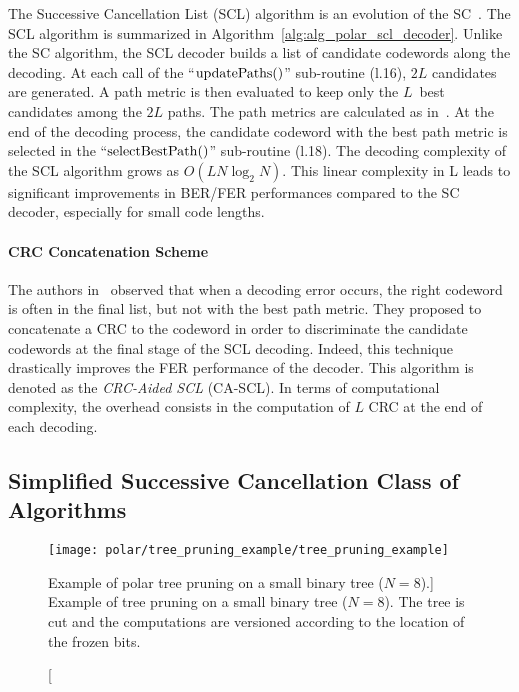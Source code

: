 The Successive Cancellation List (SCL) algorithm is an evolution of the
SC~\cite{Tal2011}. The SCL algorithm is summarized in
Algorithm~\ref{alg:alg_polar_scl_decoder}. Unlike the SC algorithm, the SCL
decoder builds a list of candidate codewords along the decoding. At each call of
the ``$\operatorname*{updatePaths}()$'' sub-routine (l.16), $2L$ candidates are generated. A
path metric is then evaluated to keep only the $L$~best candidates among the
$2L$ paths. The path metrics are calculated as
in~\cite{Balatsoukas-Stimming2015}. At the end of the decoding process, the
candidate codeword with the best path metric is selected in the
``$\operatorname*{selectBestPath}()$'' sub-routine (l.18). The decoding complexity of the
SCL algorithm grows as $O(LN\log_2N)$. This linear complexity in L leads to
significant improvements in BER/FER performances compared to the SC decoder,
especially for small code lengths.

\paragraph{CRC Concatenation Scheme}

The authors in~\cite{Tal2011} observed that when a decoding error occurs, the
right codeword is often in the final list, but not with the best path metric.
They proposed to concatenate a CRC to the codeword in order to discriminate the
candidate codewords at the final stage of the SCL decoding. Indeed, this
technique drastically improves the FER performance of the decoder. This
algorithm is denoted as the \emph{CRC-Aided SCL} (CA-SCL). In terms of
computational complexity, the overhead consists in the computation of $L$ CRC at
the end of each decoding.

\subsection{Simplified Successive Cancellation Class of Algorithms}
\label{sec:alg_polar_simplified_decoders}

\begin{figure}[htp]
  \centering
  \texttt{[image: polar/tree\_pruning\_example/tree\_pruning\_example]}
  \caption
    [Example of polar tree pruning on a small binary tree ($N = 8$).]
    {Example of tree pruning on a small binary tree ($N = 8$). The tree is cut
    and the computations are versioned according to the location of the frozen
    bits.}
  \label{fig:alg_polar_tree_pruning_example}
\end{figure}


